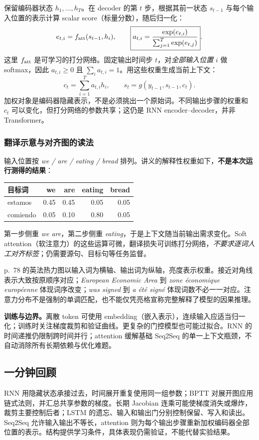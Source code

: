 保留编码器状态 $h_1,\ldots,h_T$。在 decoder 的第 $t$ 步，根据其前一状态 $s_{t-1}$ 与每个输入位置的表示计算 scalar score（标量分数），随后归一化：
\[
 e_{t,i}=f_{\rm att}(s_{t-1},h_i),\qquad
 \boxed{a_{t,i}=\frac{\exp(e_{t,i})}{\sum_{j=1}^T\exp(e_{t,j})}}.
\]
这里 $f_{\rm att}$ 是可学习的打分网络。固定输出时间步 $t$，对\emph{全部输入位置} $i$ 做 softmax，因此 $a_{t,i}\ge0$ 且 $\sum_i a_{t,i}=1$。用这些权重生成当前上下文：
\[
 \boxed{c_t=\sum_{i=1}^T a_{t,i}h_i},\qquad
 s_t=g(y_{t-1},s_{t-1},c_t).
\]
加权对象是编码器隐藏表示，不是必须挑出一个原始词。不同输出步骤的权重和 $c_t$ 可以变化，但打分网络的参数共享；这仍是 RNN encoder--decoder，并非 Transformer。

\subsubsection{翻译示意与对齐图的读法}

输入位置按 \emph{we / are / eating / bread} 排列。讲义的解释性权重如下，\textbf{不是本次运行测得的结果}：
\begin{center}
\small
\begin{tabular}{@{}lrrrr@{}}
\toprule
目标词 & we & are & eating & bread \\
\midrule
estamos & 0.45 & 0.45 & 0.05 & 0.05 \\
comiendo & 0.05 & 0.10 & 0.80 & 0.05 \\
\bottomrule
\end{tabular}
\end{center}
第一步侧重 \emph{we are}，第二步侧重 \emph{eating}，于是上下文随当前输出需求变化。Soft attention（软注意力）的这些运算可微，翻译损失可训练打分网络，\emph{不要求逐词人工对齐标签}；仍需要源句、目标句等任务监督。

p.~78 的英法热力图以输入词为横轴、输出词为纵轴，亮度表示权重。接近对角线表示大致按原顺序对应；\emph{European Economic Area} 到 \emph{zone économique européenne} 体现词序改变；\emph{was signed} 到 \emph{a été signé} 体现词数不必一一对应。注意力分布不是强制的单调匹配，也不能仅凭亮格宣称完整解释了模型的因果推理。

\textbf{训练与边界。}离散 token 可使用 embedding（嵌入表示），连续输入应适当归一化；训练时关注梯度裁剪和验证曲线。更复杂的门控模型也可能过拟合。RNN 的时间递推仍限制跨时间并行；attention 缓解基础 Seq2Seq 的单一上下文瓶颈，不自动消除所有长期依赖与优化难题。

\subsection{一分钟回顾}

RNN 用隐藏状态承接过去，时间展开重复使用同一组参数；BPTT 对展开图应用链式法则，并汇总共享参数的梯度。长期 Jacobian 连乘可能使梯度消失或爆炸，裁剪主要控制后者；LSTM 的遗忘、输入和输出门分别控制保留、写入和读出。Seq2Seq 允许输入输出不等长，attention 则为每个输出步骤重新加权编码器全部位置的表示。结构提供学习条件，具体表现仍需验证，不能代替实验结果。
